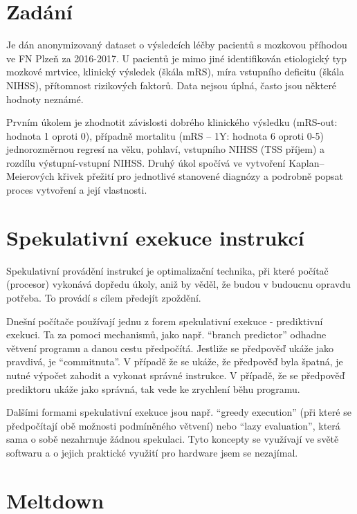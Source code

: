 \section{Zadání}

Je dán anonymizovaný dataset o výsledcích léčby pacientů s mozkovou příhodou ve FN Plzeň za 2016-2017.
U pacientů je mimo jiné identifikován etiologický typ mozkové mrtvice, klinický výsledek (škála mRS), míra vstupního deficitu (škála NIHSS), přítomnost rizikových faktorů.
Data nejsou úplná, často jsou některé hodnoty neznámé.

Prvním úkolem je zhodnotit závislosti dobrého klinického výsledku (mRS-out: hodnota 1 oproti 0), případně mortalitu (mRS – 1Y: hodnota 6 oproti 0-5) jednorozměrnou regresí na věku, pohlaví, vstupního NIHSS (TSS příjem) a rozdílu výstupní-vstupní NIHSS.
Druhý úkol spočívá ve vytvoření Kaplan–Meierových křivek přežití pro jednotlivé stanovené diagnózy a podrobně popsat proces vytvoření a její vlastnosti.

\section{Spekulativní exekuce instrukcí}

Spekulativní provádění instrukcí je optimalizační technika, při které počítač (procesor) vykonává dopředu úkoly, aniž by věděl, že budou v budoucnu opravdu potřeba.
To provádí s cílem předejít zpoždění.

Dnešní počítače používají jednu z forem spekulativní exekuce - prediktivní exekuci.
Ta za pomoci mechanismů, jako např. \enquote{branch predictor} odhadne větvení programu a danou cestu předpočítá.
Jestliže se předpověď ukáže jako pravdivá, je \enquote{commitnuta}.
V případě že se ukáže, že předpověď byla špatná, je nutné výpočet zahodit a vykonat správné instrukce.
V případě, že se předpověď prediktoru ukáže jako správná, tak vede ke zrychlení běhu programu.

Dalšími formami spekulativní exekuce jsou např. \enquote{greedy execution} (při které se předpočítají obě možnosti podmíněného větvení) nebo \enquote{lazy evaluation}, která sama o sobě nezahrnuje žádnou spekulaci.
Tyto koncepty se využívají ve světě softwaru a o jejich praktické využití pro hardware jsem se nezajímal.

\section{Meltdown}\label{sec:meltdown}

